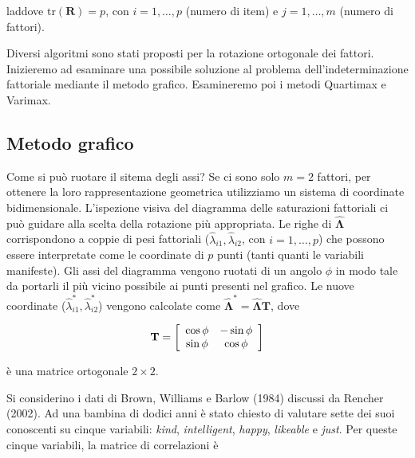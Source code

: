 \documentclass[
  11pt,
]{krantz}
\theoremstyle{definition}
\theoremstyle{definition}
\theoremstyle{definition}
\theoremstyle{definition}
\theoremstyle{remark}
\begin{document}
laddove \(\text{tr}(\textbf{R})=p\), con \(i=1, \dots, p\) (numero di item) e \(j=1, \dots, m\) (numero di fattori).

Diversi algoritmi sono stati proposti per la rotazione ortogonale dei fattori. Inizieremo ad esaminare una possibile soluzione al problema dell'indeterminazione fattoriale mediante il metodo grafico. Esamineremo poi i metodi Quartimax e Varimax.

\hypertarget{metodo-grafico}{%
\subsection{Metodo grafico}\label{metodo-grafico}}

Come si può ruotare il sitema degli assi? Se ci sono solo \(m=2\) fattori, per ottenere la loro rappresentazione geometrica utilizziamo un sistema di coordinate bidimensionale. L'ispezione visiva del diagramma delle saturazioni fattoriali ci può guidare alla scelta della rotazione più appropriata. Le righe di \(\hat{\boldsymbol{\Lambda}}\) corrispondono a coppie di pesi fattoriali (\(\hat{\lambda}_{i1}, \hat{\lambda}_{i2}\), con \(i=1, \dots, p\)) che possono essere interpretate come le coordinate di \(p\) punti (tanti quanti le variabili manifeste). Gli assi del diagramma vengono ruotati di un angolo \(\phi\) in modo tale da portarli il più vicino possibile ai punti presenti nel grafico. Le nuove coordinate (\(\hat{\lambda}_{i1}^*, \hat{\lambda}_{i2}^*\)) vengono calcolate come \(\hat{\boldsymbol{\Lambda}}^* = \hat{\boldsymbol{\Lambda}} \textbf{T}\), dove

\[
\textbf{T} = 
\left[
  \begin{array}{ c c }
  \cos{\phi} & - \sin{\phi}\\
  \sin{\phi} & \cos{\phi}
  \end{array} 
\right] 
\]

è una matrice ortogonale \(2 \times 2\).

Si considerino i dati di Brown, Williams e Barlow (1984) discussi da Rencher (2002). Ad una bambina di dodici anni è stato chiesto di valutare sette dei suoi conoscenti su cinque variabili: \emph{kind}, \emph{intelligent}, \emph{happy}, \emph{likeable} e \emph{just}. Per queste cinque variabili, la matrice di correlazioni è
\end{document}
